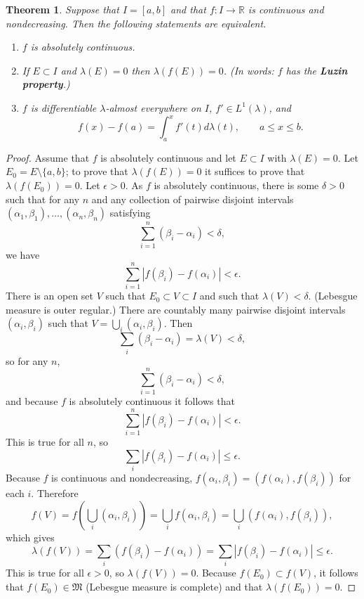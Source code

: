 \documentclass{article}
\newtheorem{theorem}{Theorem}
\theoremstyle{definition}
\begin{document}
\begin{theorem}
Suppose that $I=[a,b]$ and that $f:I \to \mathbb{R}$ is continuous and nondecreasing. Then the following statements are equivalent.
\begin{enumerate}
\item $f$ is absolutely continuous.
\item If $E \subset I$ and $\lambda(E)=0$ then $\lambda(f(E))=0$. (In words: $f$ has the \textbf{Luzin property}.)
\item $f$ is differentiable $\lambda$-almost everywhere on $I$, $f' \in L^1(\lambda)$, and 
\[
f(x)-f(a)=\int_a^x f'(t) d\lambda(t), \qquad a \leq x \leq b.
\]
\end{enumerate}
\label{TFAE}
\end{theorem}
\begin{proof}
Assume that $f$ is absolutely continuous and let $E \subset I$ with $\lambda(E)=0$. Let $E_0=E \setminus \{a,b\}$; to prove that
$\lambda(f(E))=0$ it suffices to prove that $\lambda(f(E_0))=0$. 
Let $\epsilon>0$.
As $f$ is absolutely continuous, there is some $\delta>0$ such that
for any $n$ and any
collection of pairwise disjoint intervals $(\alpha_1,\beta_1),\ldots,(\alpha_n,\beta_n)$
satisfying
\[
\sum_{i=1}^n (\beta_i-\alpha_i) < \delta,
\]
we have
\[
\sum_{i=1}^n |f(\beta_i)-f(\alpha_i)|<\epsilon.
\]
There is an open set $V$ such that $E_0 \subset V \subset I$ and such that $\lambda(V)<\delta$. (Lebesgue measure is outer regular.)
There are countably many pairwise disjoint intervals $(\alpha_i,\beta_i)$ such that
$V=\bigcup_i (\alpha_i,\beta_i)$. Then
\[
\sum_i (\beta_i-\alpha_i) = \lambda(V) < \delta,
\]
 so
for any $n$,
\[
\sum_{i=1}^n (\beta_i-\alpha_i) < \delta,
\]
and
because $f$ is absolutely continuous it follows that
\[
\sum_{i=1}^n |f(\beta_i)-f(\alpha_i)|<\epsilon.
\]
This is true for all $n$, so
\[
\sum_i  |f(\beta_i)-f(\alpha_i)| \leq \epsilon.
\]
Because $f$ is continuous and nondecreasing, $f(\alpha_i,\beta_i) = (f(\alpha_i),f(\beta_i))$ for each $i$. Therefore
\[
f(V) = f\left(\bigcup_i (\alpha_i,\beta_i)\right)=\bigcup_i f(\alpha_i,\beta_i)
= \bigcup_i  (f(\alpha_i),f(\beta_i)),
\]
which gives 
\[
\lambda(f(V)) = \sum_i (f(\beta_i)-f(\alpha_i)) = \sum_i |f(\beta_i)-f(\alpha_i)| \leq \epsilon.
\]
This is true for all $\epsilon>0$, so 
$\lambda(f(V))=0$. Because $f(E_0)\subset f(V)$, it follows that $f(E_0) \in \mathfrak{M}$ (Lebesgue measure is complete) and that
$\lambda(f(E_0))=0$.


\end{proof}
\end{document}
